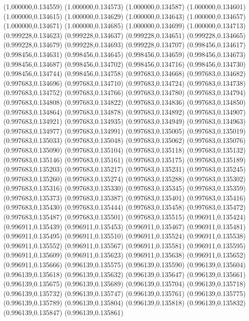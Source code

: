 (1.000000,0.134559)
(1.000000,0.134573)
(1.000000,0.134587)
(1.000000,0.134601)
(1.000000,0.134615)
(1.000000,0.134629)
(1.000000,0.134643)
(1.000000,0.134657)
(1.000000,0.134671)
(1.000000,0.134685)
(1.000000,0.134699)
(1.000000,0.134713)
(0.999228,0.134623)
(0.999228,0.134637)
(0.999228,0.134651)
(0.999228,0.134665)
(0.999228,0.134679)
(0.999228,0.134693)
(0.999228,0.134707)
(0.998456,0.134617)
(0.998456,0.134631)
(0.998456,0.134645)
(0.998456,0.134659)
(0.998456,0.134673)
(0.998456,0.134687)
(0.998456,0.134702)
(0.998456,0.134716)
(0.998456,0.134730)
(0.998456,0.134744)
(0.998456,0.134758)
(0.997683,0.134668)
(0.997683,0.134682)
(0.997683,0.134696)
(0.997683,0.134710)
(0.997683,0.134724)
(0.997683,0.134738)
(0.997683,0.134752)
(0.997683,0.134766)
(0.997683,0.134780)
(0.997683,0.134794)
(0.997683,0.134808)
(0.997683,0.134822)
(0.997683,0.134836)
(0.997683,0.134850)
(0.997683,0.134864)
(0.997683,0.134878)
(0.997683,0.134892)
(0.997683,0.134907)
(0.997683,0.134921)
(0.997683,0.134935)
(0.997683,0.134949)
(0.997683,0.134963)
(0.997683,0.134977)
(0.997683,0.134991)
(0.997683,0.135005)
(0.997683,0.135019)
(0.997683,0.135033)
(0.997683,0.135048)
(0.997683,0.135062)
(0.997683,0.135076)
(0.997683,0.135090)
(0.997683,0.135104)
(0.997683,0.135118)
(0.997683,0.135132)
(0.997683,0.135146)
(0.997683,0.135161)
(0.997683,0.135175)
(0.997683,0.135189)
(0.997683,0.135203)
(0.997683,0.135217)
(0.997683,0.135231)
(0.997683,0.135245)
(0.997683,0.135260)
(0.997683,0.135274)
(0.997683,0.135288)
(0.997683,0.135302)
(0.997683,0.135316)
(0.997683,0.135330)
(0.997683,0.135345)
(0.997683,0.135359)
(0.997683,0.135373)
(0.997683,0.135387)
(0.997683,0.135401)
(0.997683,0.135416)
(0.997683,0.135430)
(0.997683,0.135444)
(0.997683,0.135458)
(0.997683,0.135472)
(0.997683,0.135487)
(0.997683,0.135501)
(0.997683,0.135515)
(0.996911,0.135424)
(0.996911,0.135439)
(0.996911,0.135453)
(0.996911,0.135467)
(0.996911,0.135481)
(0.996911,0.135495)
(0.996911,0.135510)
(0.996911,0.135524)
(0.996911,0.135538)
(0.996911,0.135552)
(0.996911,0.135567)
(0.996911,0.135581)
(0.996911,0.135595)
(0.996911,0.135609)
(0.996911,0.135623)
(0.996911,0.135638)
(0.996911,0.135652)
(0.996911,0.135666)
(0.996139,0.135575)
(0.996139,0.135590)
(0.996139,0.135604)
(0.996139,0.135618)
(0.996139,0.135632)
(0.996139,0.135647)
(0.996139,0.135661)
(0.996139,0.135675)
(0.996139,0.135689)
(0.996139,0.135704)
(0.996139,0.135718)
(0.996139,0.135732)
(0.996139,0.135747)
(0.996139,0.135761)
(0.996139,0.135775)
(0.996139,0.135789)
(0.996139,0.135804)
(0.996139,0.135818)
(0.996139,0.135832)
(0.996139,0.135847)
(0.996139,0.135861)
